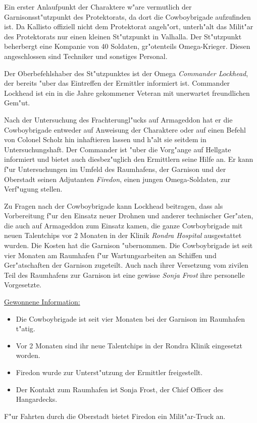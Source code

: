 
Ein erster Anlaufpunkt der Charaktere w"are vermutlich der Garnisonsst"utzpunkt des Protektorats, da dort die Cowboybrigade aufzufinden ist. Da Kallisto offiziell nicht dem Protektorat angeh"ort, unterh"alt das Milit"ar des Protektorats nur einen kleinen St"utzpunkt in Valhalla. Der St"utzpunkt beherbergt eine Kompanie von 40 Soldaten, gr"o\3tenteils Omega-Krieger. Diesen angeschlossen sind Techniker und sonstiges Personal.

Der Oberbefehlshaber des St"utzpunktes ist der Omega \emph{Commander Lockhead}, der bereits "uber das Eintreffen der Ermittler informiert ist. Commander Lockhead ist ein in die Jahre gekommener Veteran mit unerwartet freundlichen Gem"ut. 

Nach der Untersuchung des Frachterungl"ucks auf Armageddon hat er die Cowboybrigade entweder auf Anweisung der Charaktere oder auf einen Befehl von Colonel Scholz hin inhaftieren lassen und h"alt sie seitdem in Untersuchungshaft. Der Commander ist "uber die Vorg"ange auf Hellgate informiert und bietet auch diesbez"uglich den Ermittlern seine Hilfe an. Er kann f"ur Untersuchungen im Umfeld des Raumhafens, der Garnison und der Oberstadt seinen Adjutanten \emph{Firedon}, einen jungen Omega-Soldaten, zur Verf"ugung stellen. 

Zu Fragen nach der Cowboybrigade kann Lockhead beitragen, dass als Vorbereitung f"ur den Einsatz neuer Drohnen und anderer technischer Ger"aten, die auch auf Armageddon zum Einsatz kamen, die ganze Cowboybrigade mit neuen Talentchips vor 2 Monaten in der Klinik \emph{Rondra Hospital} ausgestattet wurden. Die Kosten hat die Garnison "ubernommen. Die Cowboybrigade ist seit vier Monaten am Raumhafen f"ur Wartungsarbeiten an Schiffen und Ger"atschaften der Garnison zugeteilt. Auch nach ihrer Versetzung vom zivilen Teil des Raumhafens zur Garnison ist eine gewisse \emph{Sonja Frost} ihre personelle Vorgesetzte.

\begin{remarks}
	\underline{Gewonnene Information:}
	
	\begin{itemize}
		\item Die Cowboybrigade ist seit vier Monaten bei der Garnison im Raumhafen t"atig. 
		\item Vor 2 Monaten sind ihr neue Talentchips in der Rondra Klinik eingesetzt worden.
		\item Firedon wurde zur Unterst"utzung der Ermittler freigestellt.
		\item Der Kontakt zum Raumhafen ist Sonja Frost, der Chief Officer des Hangardecks.
	\end{itemize}

	F"ur Fahrten durch die Oberstadt bietet Firedon ein Milit"ar-Truck an.
	 
\end{remarks}

